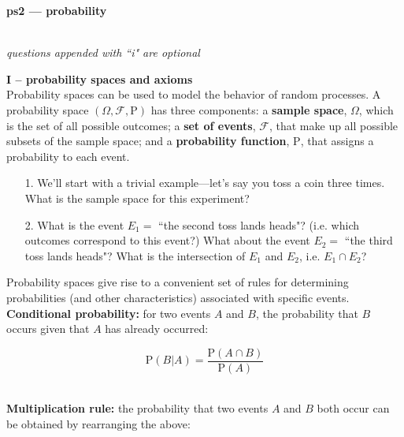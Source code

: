 \documentclass[10pt]{extarticle}
\renewcommand{\P}{\text{P}}
\begin{document}
\setlength{\parindent}{0pt}





{\bf \huge ps2 --- probability}

\hrulefill \\

{\it questions appended with ``i" are optional} \\

\hfill





{\bf \Large I -- probability spaces and axioms}  \\ 

Probability spaces can be used to model the behavior of random processes. A probability space $(\Omega, \mathcal F, \P)$ has three components: a {\bf sample space}, $\Omega$, which is the set of all possible outcomes; a {\bf set of events}, $\mathcal F$, that make up all possible subsets of the sample space; and a {\bf probability function}, $\P$, that assigns a probability to each event. 

\hfill 

\begin{itemize}
        
        \item[1.] We'll start with a trivial example---let's say you toss a coin three times.  What is the sample space for this experiment? \\

        \item[2.] What is the event $E_1 =$ ``the second toss lands heads"? (i.e. which outcomes correspond to this event?) What about the event $E_2 =$ ``the third toss lands heads"? What is the intersection of $E_1$ and $E_2$, i.e. $E_1 \cap E_2$?

\end{itemize} 

\hfill 

Probability spaces give rise to a convenient set of rules for determining probabilities (and other characteristics) associated with specific events. \\ 

{\bf Conditional probability:} for two events $A$ and $B$, the probability that $B$ occurs given that $A$ has already occurred:

$$\P(B|A) = \frac{\P(A \cap B)}{\P(A)}$$ \ 

{\bf Multiplication rule:} the probability that two events $A$ and $B$ both occur can be obtained by rearranging the above:
\end{document}
